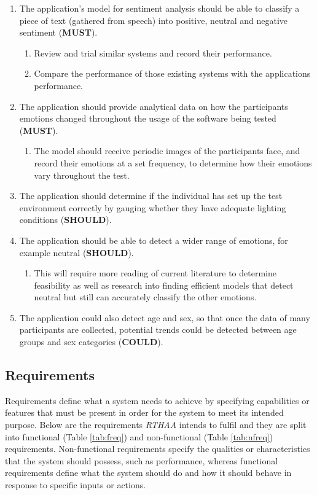 \documentclass[12pt, a4paper]{article}
\begin{document}
\begin{enumerate}
    \item The application's model for sentiment analysis should be able to classify a piece of text (gathered from speech) into positive, neutral and negative sentiment (\textbf{MUST}).
        \begin{enumerate}
            \item Review and trial similar systems and record their performance.
            \item Compare the performance of those existing systems with the applications performance.
        \end{enumerate}
	
	\item The application should provide analytical data on how the participants emotions changed throughout the usage of the software being tested (\textbf{MUST}).
		\begin{enumerate}
		 	\item The model should receive periodic images of the participants face, and record their emotions at a set frequency, to determine how their emotions vary throughout the test.
		\end{enumerate}
	
  	\item The application should determine if the individual has set up the test environment correctly by gauging whether they have adequate lighting conditions (\textbf{SHOULD}).
  	
  	\item The application should be able to detect a wider range of emotions, for example neutral (\textbf{SHOULD}).
  		\begin{enumerate}
		 	\item This will require more reading of current literature to determine feasibility as well as research into finding efficient models that detect neutral but still can accurately classify the other emotions.
		\end{enumerate}
  			
	\item The application could also detect age and sex, so that once the data of many participants are collected, potential trends could be detected between age groups and sex categories (\textbf{COULD}). 
	
\end{enumerate}

\subsection{Requirements}
\label{reqs}
Requirements define what a system needs to achieve by specifying capabilities or features that must be present in order for the system to meet its intended purpose. Below are the requirements \textit{RTHAA} intends to fulfil and they are split into functional (Table \ref{tab:freq}) and non-functional (Table \ref{tab:nfreq}) requirements. Non-functional requirements specify the qualities or characteristics that the system should possess, such as performance, whereas functional requirements define what the system should do and how it should behave in response to specific inputs or actions.
\end{document}
